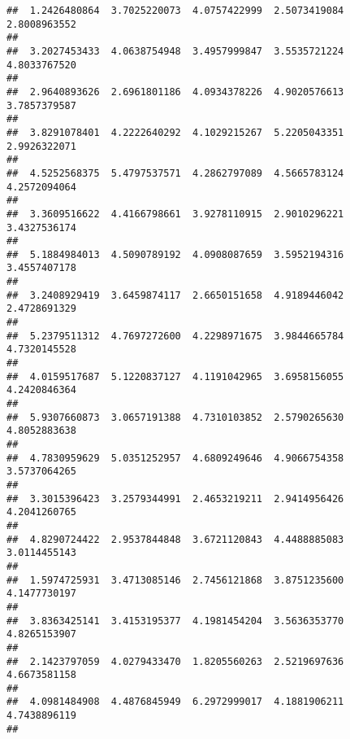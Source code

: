 \documentclass[]{article}
\begin{document}
\begin{verbatim}
##  1.2426480864  3.7025220073  4.0757422999  2.5073419084  2.8008963552 
##                                                                       
##  3.2027453433  4.0638754948  3.4957999847  3.5535721224  4.8033767520 
##                                                                       
##  2.9640893626  2.6961801186  4.0934378226  4.9020576613  3.7857379587 
##                                                                       
##  3.8291078401  4.2222640292  4.1029215267  5.2205043351  2.9926322071 
##                                                                       
##  4.5252568375  5.4797537571  4.2862797089  4.5665783124  4.2572094064 
##                                                                       
##  3.3609516622  4.4166798661  3.9278110915  2.9010296221  3.4327536174 
##                                                                       
##  5.1884984013  4.5090789192  4.0908087659  3.5952194316  3.4557407178 
##                                                                       
##  3.2408929419  3.6459874117  2.6650151658  4.9189446042  2.4728691329 
##                                                                       
##  5.2379511312  4.7697272600  4.2298971675  3.9844665784  4.7320145528 
##                                                                       
##  4.0159517687  5.1220837127  4.1191042965  3.6958156055  4.2420846364 
##                                                                       
##  5.9307660873  3.0657191388  4.7310103852  2.5790265630  4.8052883638 
##                                                                       
##  4.7830959629  5.0351252957  4.6809249646  4.9066754358  3.5737064265 
##                                                                       
##  3.3015396423  3.2579344991  2.4653219211  2.9414956426  4.2041260765 
##                                                                       
##  4.8290724422  2.9537844848  3.6721120843  4.4488885083  3.0114455143 
##                                                                       
##  1.5974725931  3.4713085146  2.7456121868  3.8751235600  4.1477730197 
##                                                                       
##  3.8363425141  3.4153195377  4.1981454204  3.5636353770  4.8265153907 
##                                                                       
##  2.1423797059  4.0279433470  1.8205560263  2.5219697636  4.6673581158 
##                                                                       
##  4.0981484908  4.4876845949  6.2972999017  4.1881906211  4.7438896119 
##                                                                       

\end{verbatim}
\end{document}
